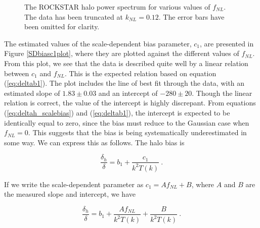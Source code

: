 \documentclass[10pt,letterpaper,final]{iopart}
\numberwithin{equation}{subsection}
\def\ni{\noindent}
\begin{document}
\begin{figure}[!htb]
\begin{center}
\caption{The ROCKSTAR halo power spectrum for various values of $f_{NL}$. The data has been truncated at $k_{NL} = 0.12$. The error bars have been omitted for clarity.}
\label{halofnlplot}
\end{center}
\end{figure}


The estimated values of the scale-dependent bias parameter, $c_1$, are presented in Figure \ref{SDbiasc1plot}, where they are plotted against the different values of $f_{NL}$. From this plot, we see that the data is described quite well by a linear relation between $c_1$ and $f_{NL}$. This is the expected relation based on equation (\ref{eq:deltab1}). The plot includes the line of best fit through the data, with an estimated slope of $1.83 \pm 0.03$ and an intercept of $-280 \pm 20$. Though the linear relation is correct, the value of the intercept is highly discrepant. From equations (\ref{eq:deltah_scalebias}) and (\ref{eq:deltab1}), the intercept is expected to be identically equal to zero, since the bias must reduce to the Gaussian case when $f_{NL} = 0$. This suggests that the bias is being systematically underestimated in some way. We can express this as follows. The halo bias is

\begin{equation}
\frac{\delta_h}{\delta}= b_1 + \frac{c_1}{k^2 T(k)} \ .
\end{equation}

\ni If we write the scale-dependent parameter as $c_1 = A f_{NL} + B $, where $A$ and $B$ are the measured slope and intercept, we have

\begin{equation}
\frac{\delta_h}{\delta}= b_1 + \frac{A f_{NL}}{k^2 T(k)} + \frac{B}{k^2 T(k)} \ .
\end{equation}
\end{document}
